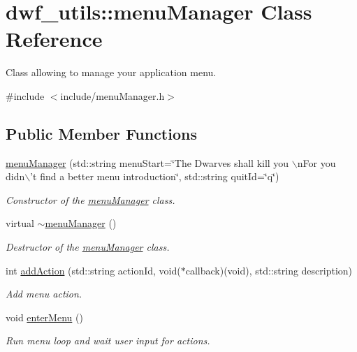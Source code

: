 \hypertarget{classdwf__utils_1_1menu_manager}{\section{dwf\-\_\-utils\-:\-:menu\-Manager \-Class \-Reference}
\label{classdwf__utils_1_1menu_manager}
}


\-Class allowing to manage your application menu.  




{\ttfamily \#include $<$include/menu\-Manager.\-h$>$}

\subsection*{\-Public \-Member \-Functions}
\begin{DoxyCompactItemize}
\item 
\hyperlink{classdwf__utils_1_1menu_manager_aec39eb4ae7e3400295b2701da3de737c}{menu\-Manager} (std\-::string menu\-Start=\char`\"{}\-The \-Dwarves shall kill you $\backslash$n\-For you didn$\backslash$'t find a better menu introduction\char`\"{}, std\-::string quit\-Id=\char`\"{}q\char`\"{})
\begin{DoxyCompactList}\small\item\em \-Constructor of the \hyperlink{classdwf__utils_1_1menu_manager}{menu\-Manager} class. \end{DoxyCompactList}\item 
virtual \hyperlink{classdwf__utils_1_1menu_manager_ad1bee0343e5c351933ad8905a92dd677}{$\sim$menu\-Manager} ()
\begin{DoxyCompactList}\small\item\em \-Destructor of the \hyperlink{classdwf__utils_1_1menu_manager}{menu\-Manager} class. \end{DoxyCompactList}\item 
int \hyperlink{classdwf__utils_1_1menu_manager_ac49bb4083beb16254afc00db078674db}{add\-Action} (std\-::string action\-Id, void($\ast$callback)(void), std\-::string description)
\begin{DoxyCompactList}\small\item\em \-Add menu action. \end{DoxyCompactList}\item 
void \hyperlink{classdwf__utils_1_1menu_manager_a0c22a7e10e567a450ad26c3dac2abbd3}{enter\-Menu} ()
\begin{DoxyCompactList}\small\item\em \-Run menu loop and wait user input for actions. \end{DoxyCompactList}\end{DoxyCompactItemize}

